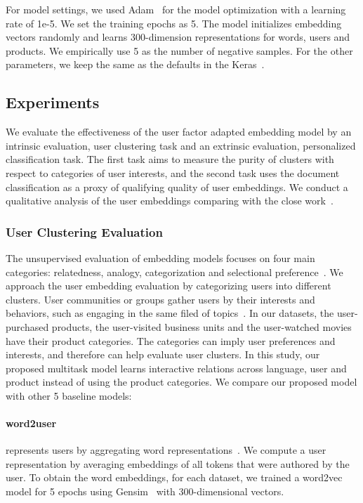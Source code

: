 For model settings, we used Adam~\cite{kingma2014adam} for the model optimization with a learning rate of 1e-5. We set the training epochs as 5. The model initializes embedding vectors randomly and learns 300-dimension representations for words, users and products. We empirically use 5 as the number of negative samples. For the other parameters, we keep the same as the defaults in the Keras~\cite{chollet2015keras}. 


\subsection{Experiments}
\label{chap4:subsec:exp2}

We evaluate the effectiveness of the user factor adapted embedding model by an intrinsic evaluation, user clustering task and an extrinsic evaluation, personalized classification task. The first task aims to measure the purity of clusters with respect to categories of user interests, and the second task uses the document classification as a proxy of qualifying quality of user embeddings. We conduct a qualitative analysis of the user embeddings comparing with the close work~\cite{amir2017quantifying}.


\subsubsection{User Clustering Evaluation}

The unsupervised evaluation of embedding models focuses on four main categories: relatedness, analogy, categorization and selectional preference~\cite{schnabel2015evaluation}.
We approach the user embedding evaluation by categorizing users into different clusters. 
User communities or groups gather users by their interests and behaviors, such as engaging in the same filed of topics~\cite{benton2016learning, yang2017overcoming}.
In our datasets, the user-purchased products, the user-visited business units and the user-watched movies have their product categories. 
The categories can imply user preferences and interests, and therefore can help evaluate user clusters.
In this study, our proposed multitask model learns interactive relations across language, user and product instead of using the product categories. We compare our proposed model with other 5 baseline models:

\paragraph{word2user} 
represents users by aggregating word representations~\cite{benton2016learning}. We compute a user representation by averaging embeddings of all tokens that were authored by the user. To obtain the word embeddings, for each dataset, we trained a word2vec model for 5 epochs using Gensim~\cite{rehurek2010software} with 300-dimensional vectors.


